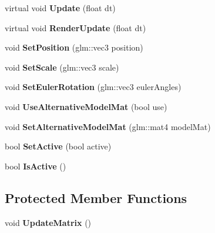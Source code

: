\begin{DoxyCompactItemize}
\item 
\hypertarget{class_object_a03bd9ae689e9535934f46222644f44aa}{}virtual void {\bfseries Update} (float dt)\label{class_object_a03bd9ae689e9535934f46222644f44aa}

\item 
\hypertarget{class_object_a9b9491a79b85055e08ab3c8e7f2a4283}{}virtual void {\bfseries Render\+Update} (float dt)\label{class_object_a9b9491a79b85055e08ab3c8e7f2a4283}

\item 
\hypertarget{class_object_adbffb47c9daf536f5ccd668d060a0490}{}void {\bfseries Set\+Position} (glm\+::vec3 position)\label{class_object_adbffb47c9daf536f5ccd668d060a0490}

\item 
\hypertarget{class_object_a08faf59cf967fae31dd3ed0aea43a372}{}void {\bfseries Set\+Scale} (glm\+::vec3 scale)\label{class_object_a08faf59cf967fae31dd3ed0aea43a372}

\item 
\hypertarget{class_object_a0aaf9cce0a37d5bb0af6eb11ab8dce64}{}void {\bfseries Set\+Euler\+Rotation} (glm\+::vec3 euler\+Angles)\label{class_object_a0aaf9cce0a37d5bb0af6eb11ab8dce64}

\item 
\hypertarget{class_object_a5930b30196790ae109835e4f24a85b29}{}void {\bfseries Use\+Alternative\+Model\+Mat} (bool use)\label{class_object_a5930b30196790ae109835e4f24a85b29}

\item 
\hypertarget{class_object_a178b374670d4681c61556a352276f96a}{}void {\bfseries Set\+Alternative\+Model\+Mat} (glm\+::mat4 model\+Mat)\label{class_object_a178b374670d4681c61556a352276f96a}

\item 
\hypertarget{class_object_ab1946453ecbf12a897ba6a363704cd86}{}bool {\bfseries Set\+Active} (bool active)\label{class_object_ab1946453ecbf12a897ba6a363704cd86}

\item 
\hypertarget{class_object_a49327b515f7e613c882f33c2b058ab98}{}bool {\bfseries Is\+Active} ()\label{class_object_a49327b515f7e613c882f33c2b058ab98}

\end{DoxyCompactItemize}
\subsection*{Protected Member Functions}
\begin{DoxyCompactItemize}
\item 
\hypertarget{class_object_af08c7cf7a01b230d6967551c52bdff63}{}void {\bfseries Update\+Matrix} ()\label{class_object_af08c7cf7a01b230d6967551c52bdff63}

\end{DoxyCompactItemize}
